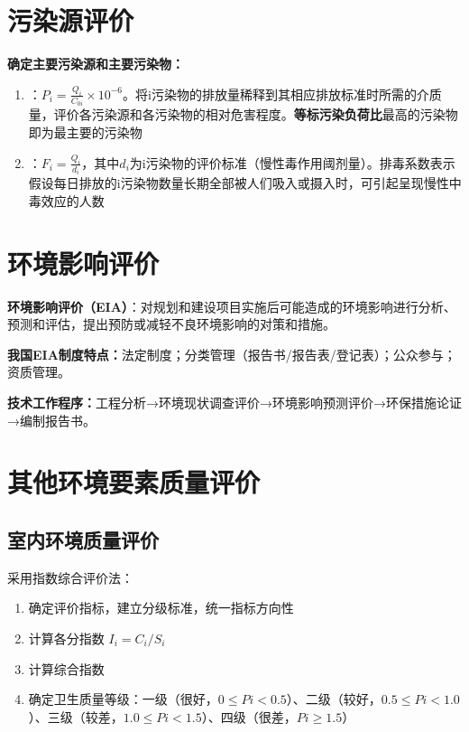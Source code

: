 \section{污染源评价}

\textbf{确定主要污染源和主要污染物：}
\begin{enumerate}[leftmargin=*]
    \item {}：$P_i = \frac{Q_i}{C_{0i}} \times 10^{-6}$。将i污染物的排放量稀释到其相应排放标准时所需的介质量，评价各污染源和各污染物的相对危害程度。\textbf{等标污染负荷比}最高的污染物即为最主要的污染物
    \item {}：$F_i = \frac{Q_i}{d_i}$，其中$d_i$为i污染物的评价标准（慢性毒作用阈剂量）。排毒系数表示假设每日排放的i污染物数量长期全部被人们吸入或摄入时，可引起呈现慢性中毒效应的人数
\end{enumerate}

\section{环境影响评价}

\begin{defbox}
\textbf{环境影响评价（EIA）}：对规划和建设项目实施后可能造成的环境影响进行分析、预测和评估，提出预防或减轻不良环境影响的对策和措施。
\end{defbox}

\textbf{我国EIA制度特点：}法定制度；分类管理（报告书/报告表/登记表）；公众参与；资质管理。

\textbf{技术工作程序：}工程分析→环境现状调查评价→环境影响预测评价→环保措施论证→编制报告书。

\section{其他环境要素质量评价}

\subsection{室内环境质量评价}
采用指数综合评价法：
\begin{enumerate}[leftmargin=*]
    \item 确定评价指标，建立分级标准，统一指标方向性
    \item 计算各分指数 $I_i = C_i / S_i$
    \item 计算综合指数
    \item 确定卫生质量等级：一级（很好，$0 \leq Pi < 0.5$）、二级（较好，$0.5 \leq Pi < 1.0$）、三级（较差，$1.0 \leq Pi < 1.5$）、四级（很差，$Pi \geq 1.5$）
\end{enumerate}

